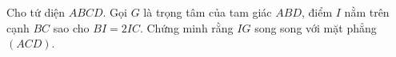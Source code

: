 \begin{bt}%
%			
%			
%			

\begin{bt}%
	Cho tứ diện $ABCD$. Gọi $G$ là trọng tâm của tam giác $ABD$, điểm $I$ nằm trên cạnh $BC$ sao cho $BI=2IC$. Chứng minh rằng $IG$ song song với mặt phẳng $(ACD)$.
\end{bt}
\end{bt}
